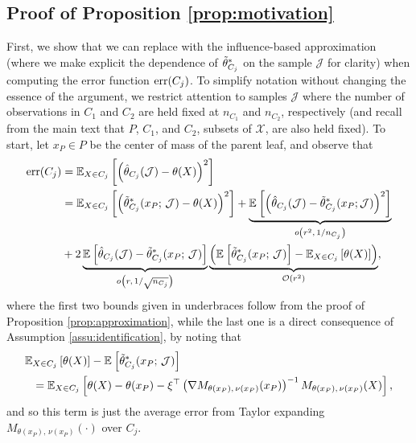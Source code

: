\documentclass[aos]{imsart}
\theoremstyle{plain}
\theoremstyle{definition}
\theoremstyle{remark}
\begin{document}
\begin{CJK}{UTF8}{gbsn}
{\begin{appendix}
\subsection*{Proof of Proposition \ref{prop:motivation}}

First, we show that we can replace  with the influence-based
approximation  (where we make explicit the dependence
of $\tilde{\theta}^*_{C_j}$ on the sample $\mathcal{J}$ for clarity) when computing the error function $\operatorname{err}(C_j)$.  To simplify notation without changing the essence of the argument,
we restrict attention to samples $\mathcal{J}$ where the number of observations in $C_1$ and $C_2$ are held fixed at $n_{C_1}$ and $n_{C_2}$, respectively (and recall from the main text that $P$, $C_1$, and $C_2$, subsets of $\mathcal{X}$, are also held fixed).  To start, let $x_P \in P$ be the center of mass of the parent leaf, and observe that
\begin{equation*}
\begin{split}
\err(C_j) &= \EE[X \in C_j]{\p{\htheta_{C_j}(\mathcal{J}) - \theta(X)}^2} \\
&= \EE[X \in C_j]{\p{\ttheta_{C_j}^*(x_P;\,\mathcal{J}) - \theta(X)}^2} 
 + \underbrace{\EE{\p{\htheta_{C_j}(\mathcal{J}) - \ttheta^*_{C_j}(x_P; \mathcal{J})}^2}}_{o\p{r^2, \, 1/n_{C_j}}} \\
& + 2 \underbrace{\EE{\htheta_{C_j}(\mathcal{J}) - \ttheta^*_{C_j}(x_P;\,\mathcal{J})}}_{o\p{r, \, 1/\sqrt{n_{C_j}}}} 
 \underbrace{\p{\EE{\ttheta_{C_j}^*(x_P;\,\mathcal{J})} - \EE[X \in C_j]{\theta(X)}}}_{\oo\p{r^2}},
\end{split}
\end{equation*}
where the first two bounds given in underbraces follow from the proof of Proposition \ref{prop:approximation},
while the last one is a direct consequence of Assumption \ref{assu:identification}, by noting that
\begin{align*}
&\EE[X \in C_j]{\theta(X)} - \EE{\ttheta_{C_j}^*(x_P;\,\mathcal{J})} \\
& \ \ = \EE[X \in C_j]{\theta(X) - \theta(x_P) - \xi^\top \p{\nabla M_{\theta(x_P), \, \nu(x_P)}(x_P)}^{-1} M_{\theta(x_P), \, \nu(x_P)}(X)},
 \end{align*}
and so this term is just the average error from Taylor expanding $M_{\theta(x_P), \, \nu(x_P)}(\cdot)$
over $C_j$. 

\end{appendix}}
\end{CJK}
\end{document}
